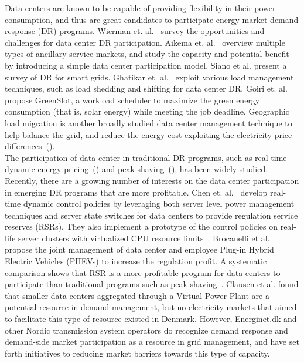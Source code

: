 Data centers are known to be capable of providing flexibility in their power consumption, and thus are great candidates to participate energy market demand response (DR) programs. Wierman et. al.~\cite{WiermanIGCC} survey the opportunities and challenges for data center DR participation. Aikema et. al.~\cite{aikema2012data} overview multiple types of ancillary service markets, and study the capacity and potential benefit by introducing a simple data center participation model. Siano et al. \cite{siano2014demand} present a survey of DR for smart grids. Ghatikar et. al.~\cite{ghatikar2012demand} exploit various load management techniques, such as load shedding and shifting for data center DR. Goiri et. al.~\cite{goiri2015matching} propose GreenSlot, a workload scheduler to maximize the green energy consumption (that is, solar energy) while meeting the job deadline. Geographic load migration is another broadly studied data center management technique to help balance the grid, and reduce the energy cost exploiting the electricity price differences~(\cite{wangexploring,wang2013data,chiu2012electric,liu2011greening,lin2012online}). \\

The participation of data center in traditional DR programs, such as real-time dynamic energy pricing~(\cite{wang2013sequential,ghamkhari2012data,liu2014pricing}) and peak shaving~(\cite{urgaonkar2011optimal,PSUSigmetrics12,aksanli2013architecting}), has been widely studied. Recently, there are a growing number of interests on the data center participation in emerging DR programs that are more profitable. Chen et. al.~\cite{chenASPDAC} develop real-time dynamic control policies by leveraging both server level power management techniques and server state switches for data centers to provide regulation service reserves (RSRs). They also implement a prototype of the control policies on real-life server clusters with virtualized CPU resource limits~\cite{chendynamic}. Brocanelli et al.~\cite{brocanelli2013joint} propose the joint management of data center and employee Plug-in Hybrid Electric Vehicles (PHEVs) to increase the regulation profit. A systematic comparison shows that RSR is a more profitable program for data centers to participate than traditional programs such as peak shaving~\cite{chenIGCC}. Clausen et al. \cite{clausen2014load} found that smaller data centers aggregated through a Virtual Power Plant are a potential resource in demand management, but no electricity markets that aimed to facilitate this type of resource existed in Denmark. However, Energinet.dk and other Nordic transmission system operators do recognize demand response and demand-side market participation as a resource in grid management, and have set forth initiatives to reducing market barriers towards this type of capacity.




